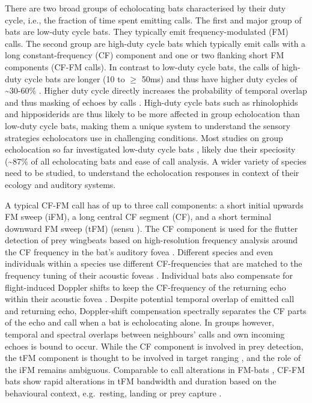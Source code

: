 \documentclass[
]{book}
\begin{document}
There are two broad groups of echolocating bats \citep{fenton2012evolution} characterised by their duty cycle, i.e., the fraction of time spent emitting calls. The first and major group of bats are low-duty cycle bats. They typically emit frequency-modulated (FM) calls. The second group are high-duty cycle bats which typically emit calls with a long constant-frequency (CF) component and one or two flanking short FM components (CF-FM calls). In contrast to low-duty cycle bats, the calls of high-duty cycle bats are longer (10 to \(\geq\) 50ms) and thus have higher duty cycles of \textasciitilde30-60\(\%\) \citep{fenton2012evolution}. Higher duty cycle directly increases the probability of temporal overlap and thus masking of echoes by calls \citep{beleyur2019modeling}. High-duty cycle bats such as rhinolophids and hipposiderids are thus likely to be more affected in group echolocation than low-duty cycle bats, making them a unique system to understand the sensory strategies echolocators use in challenging conditions. Most studies on group echolocation so far investigated low-duty cycle bats \citep{lin2016a, fawcett2015clutter, goetze2016a}, likely due their speciosity (\textasciitilde87\% of all echolocating bats \citep{fenton2012evolution, mammdivdatabase} and ease of call analysis. A wider variety of species need to be studied, to understand the echolocation responses in context of their ecology and auditory systems.

A typical CF-FM call has of up to three call components: a short initial upwards FM sweep (iFM), a long central CF segment (CF), and a short terminal downward FM sweep (tFM) (sensu \citet{tian1997echolocation}). The CF component is used for the flutter detection of prey wingbeats \citep{schnitzler2011auditory} based on high-resolution frequency analysis around the CF frequency in the bat's auditory fovea \citep{neuweiler2000biology}. Different species and even individuals within a species use different CF-frequencies that are matched to the frequency tuning of their acoustic foveas \citep{schnitzler1976peripheral}. Individual bats also compensate for flight-induced Doppler shifts to keep the CF-frequency of the returning echo within their acoustic fovea \citep{schnitzler1973control, schoeppler2018precise}. Despite potential temporal overlap of emitted call and returning echo, Doppler-shift compensation spectrally separates the CF parts of the echo and call when a bat is echolocating alone. In groups however, temporal and spectral overlaps between neighbours' calls and own incoming echoes is bound to occur. While the CF component is involved in prey detection, the tFM component is thought to be involved in target ranging \citep{tian1997echolocation, neuweiler1987foraging}, and the role of the iFM remains ambiguous. Comparable to call alterations in FM-bats \citep{Fenton2014}, CF-FM bats show rapid alterations in tFM bandwidth and duration based on the behavioural context, e.g.~resting, landing or prey capture \citep{neuweiler1987foraging, schoeppler2018precise, tian1997echolocation}.
\end{document}
